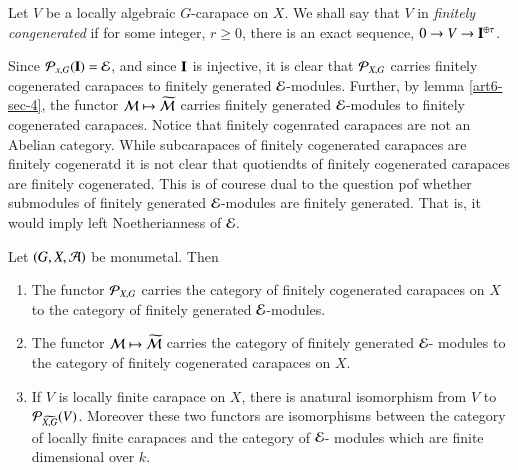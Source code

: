 \begin{definition}\label{art6-definition-15.6}
Let $V$ be a locally algebraic $G$-carapace on $X$. We shall say that $V$ in \textit{finitely congenerated} if for some integer, $r \geq 0$, there is an exact sequence, $0 \rightarrow V \rightarrow \mathbf{I}^{\oplus \tau}$.
\end{definition}

Since $\mathcal{P}_{x, G}(\mathbf{I}) =\mathcal{E}$, and since $\mathbf{I}$ is injective, it is clear that $\mathcal{P}_{X, G}$ carries finitely cogenerated carapaces to finitely generated $\mathcal{E}$-modules. Further, by lemma \ref{art6-sec-4}, the functor
$\mathcal{M} \mapsto \widetilde{\mathcal{M}}$ carries finitely generated $\mathcal{E}$-modules to finitely  cogenerated carapaces. Notice that finitely cogenrated carapaces are not an Abelian category. While subcarapaces of finitely cogenerated carapaces are finitely cogeneratd it is not clear that quotiendts of finitely cogenerated carapaces are finitely cogenerated. This is of courese dual to the question pof whether submodules of finitely generated $\mathcal{E}$-modules are finitely generated. That is, it would imply left Noetherianness of $\mathcal{E}$.

\begin{theorem}\label{art6-thm-15.7}
Let $(G, X, \mathcal{A})$ be monumetal. Then
\begin{enumerate}[(1)]
\item The functor $\mathcal{P}_{X, G}$ carries the category of finitely cogenerated carapaces on $X$ to the category of finitely generated $\mathcal{E}$-modules.\label{art6-thm15.7-enum-1}

\item The functor $\mathcal{M} \mapsto \widetilde{\mathcal{M}}$ carries the category of finitely generated $\mathcal{E}$- modules to the category of finitely cogenerated carapaces on $X$.\label{art6-thm15.7-enum-2}

\item If $V$ is locally finite carapace on $X$, there is anatural isomorphism from $V$ to $\mathcal{P}_{\widetilde{X,G}}(V)$. Moreover these two functors are isomorphisms between the category of locally finite carapaces and the category of $\mathcal{E}$- modules which are finite dimensional over $k$.\label{art6-thm15.7-enum-3}
\end{enumerate}
\end{theorem}

